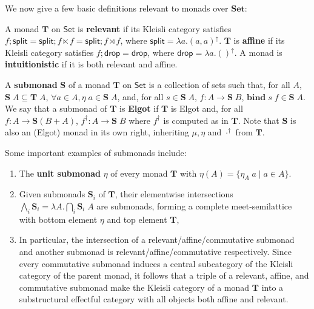 \documentclass[acmsmall,screen,review]{acmart}
\newcommand{\mb}[1]{\ensuremath{\mathbf{#1}}}
\newcommand{\ms}[1]{\ensuremath{\mathsf{#1}}}
\newcommand{\upg}[2]{{#1}^{\uparrow #2}}
\begin{document}
We now give a few basic definitions relevant to monads over \(\mb{Set}\):
\begin{definition}
  A monad \(\mb{T}\) on \(\ms{Set}\) is \textbf{relevant} if its Kleisli
  category satisfies \(f;\ms{split} = \ms{split};f \ltimes f = \ms{split};f
  \rtimes f\), where \(\ms{split} = \upg{\lambda a. (a, a)}{}\). \(\mb{T}\) is
  \textbf{affine} if its Kleisli category satisfies \(f;\ms{drop} = \ms{drop}\),
  where \(\ms{drop} = \upg{\lambda a.()}{}\). A monad is \textbf{intuitionistic}
  if it is both relevant and affine.
\end{definition}
\begin{definition}[Submonad] 
  A \textbf{submonad} \(\mb{S}\) of a monad \(\mb{T}\) on \(\ms{Set}\) is a
  collection of sets such that, for all \(A\), \(\mb{S}\;A \subseteq
  \mb{T}\;A\), \(\forall a \in A, \eta\;a \in \mb{S}\;A\), and, for all \(s \in
  \mb{S}\;A\), \(f: A \to \mb{S}\;B\), \(\mb{bind}\;s\;f \in \mb{S}\;A\). We say
  that a submonad of \(\mb{T}\) is \textbf{Elgot} if \(\mb{T}\) is Elgot and,
  for all \(f: A \to \mb{S}(B + A)\), \(f^\dagger: A \to \mb{S}\;B\) where
  \(f^\dagger\) is computed as in \(\mb{T}\). Note that \(\mb{S}\) is also an
  (Elgot) monad in its own right, inheriting \(\mu, \eta\) and \(\cdot^\dagger\)
  from \(\mb{T}\).
\end{definition}
Some important examples of submonads include:
\begin{enumerate}
  \item The \textbf{unit submonad} \(\eta\) of every monad \(\mb{T}\) with
  \(\eta(A) = \{\eta_A\;a \mid a \in A\}\).
  \item Given submonads \(\mb{S}_i\) of \(\mb{T}\), their elementwise
  intersections \(\bigwedge_i\mb{S}_i = \lambda A. \bigcap_i \mb{S}_i\;A\) are
  submonads, forming a complete meet-semilattice with bottom element \(\eta\)
  and top element \(\mb{T}\),
  \item In particular, the intersection of a relevant/affine/commutative
  submonad and another submonad is relevant/affine/commutative respectively.
  Since every commutative submonad induces a central subcategory of the Kleisli
  category of the parent monad, it follows that a triple of a relevant, affine,
  and commutative submonad make the Kleisli category of a monad \(\mb{T}\) into
  a substructural effectful category with all objects both affine and relevant.
\end{enumerate}
\end{document}
